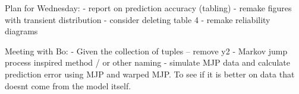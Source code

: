 Plan for Wednesday: 
- report on prediction accuracy (tabling) %
- remake figures with transient distribution %
- consider deleting table 4
- remake reliability diagrams %




Meeting with Bo:
- Given the collection of tuples -- remove y2
- Markov jump process inspired method / or other naming
- simulate MJP data and calculate prediction error using MJP and warped MJP. To see if it is better on data that doesnt come from the model itself.





